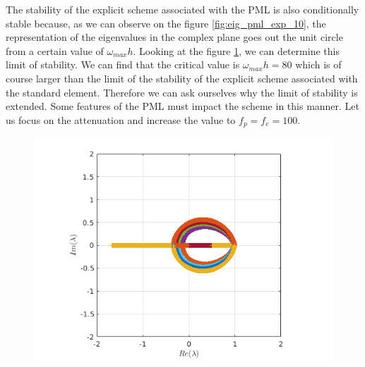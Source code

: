 \begin{itemize}
\begin{figure}[H]
\begin{minipage}{.5\textwidth}
  \label{fig:spect_rad_pml_exp_10}
\end{minipage}
\end{figure} 
The stability of the explicit scheme associated with the PML is also conditionally stable because, as we can observe on the figure \ref{fig:eig_pml_exp_10}, the representation of the eigenvalues in the complex plane goes out the unit circle from a certain value of $\omega_{max} h$. Looking at the figure \ref{fig:spect_rad_pml_exp_10}, we can determine this limit of stability. We can find that the critical value is $\omega_{max} h = 80$ which is of course larger than the limit of the stability of the explicit scheme associated with the standard element. Therefore we can ask ourselves why the limit of stability is extended. Some features of the PML must impact the scheme in this manner. Let us focus on the attenuation and increase the value to $f_p = f_e = 100$.
\begin{figure}[H]
\centering
\begin{minipage}{.5\textwidth}
  \centering
  \includegraphics[width=.90\linewidth]{images/eig_pml_exp_100.png}
  \label{fig:eig_pml_exp_100}
\end{minipage}%
\begin{minipage}{.5\textwidth}
  \centering

\end{minipage}
\end{figure}
\end{itemize}

